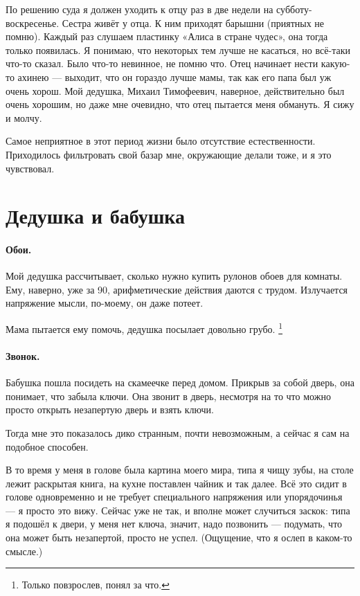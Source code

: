 \documentclass{book}
\begin{document}
По решению суда я должен уходить к отцу раз в две недели на субботу-воскресенье.
Сестра живёт у отца.
К ним приходят барышни (приятных не помню).
Каждый раз слушаем пластинку «Алиса в стране чудес»,
она тогда только появилась.
Я понимаю, что некоторых тем лучше не касаться,
но всё-таки что-то сказал.
Было что-то невинное, не помню что.
Отец начинает нести какую-то ахинею ---
выходит, что он гораздо лучше мамы,
так как его папа был уж очень хорош.
Мой дедушка, Михаил Тимофеевич, наверное, действительно был очень хорошим,
но даже мне очевидно, что отец пытается меня обмануть.
Я сижу и молчу.

Самое неприятное в этот период жизни было отсутствие естественности.
Приходилось фильтровать свой базар мне, окружающие делали тоже, и я это чувствовал.

\section*{Дедушка и бабушка}

\paragraph{Обои.} 
Мой дедушка рассчитывает, сколько нужно купить рулонов обоев для комнаты.
Ему, наверно, уже за 90, 
арифметические действия даются с трудом.
Излучается напряжение мысли, по-моему, он даже потеет.

Мама пытается ему помочь, 
дедушка посылает довольно грубо.%
\footnote{Только повзрослев, понял за что.}

\paragraph{Звонок.}
Бабушка пошла посидеть на скамеечке перед домом.
Прикрыв за собой дверь, она понимает, что забыла ключи.
Она звонит в дверь, несмотря на то что можно просто открыть незапертую дверь и взять ключи.

Тогда мне это показалось дико странным, почти невозможным, а сейчас я сам на подобное способен.

В то время у меня в голове была картина моего мира, типа я чищу зубы, на столе лежит раскрытая книга, на кухне поставлен чайник и так далее.
Всё это сидит в голове одновременно и не требует специального напряжения или упорядочинья --- я просто это вижу.
Сейчас уже не так, и вполне может случиться заскок: типа я подошёл к двери, у меня нет ключа, значит, надо позвонить --- подумать, что она может быть незапертой, просто не успел.
(Ощущение, что я ослеп в каком-то смысле.)
\end{document}
